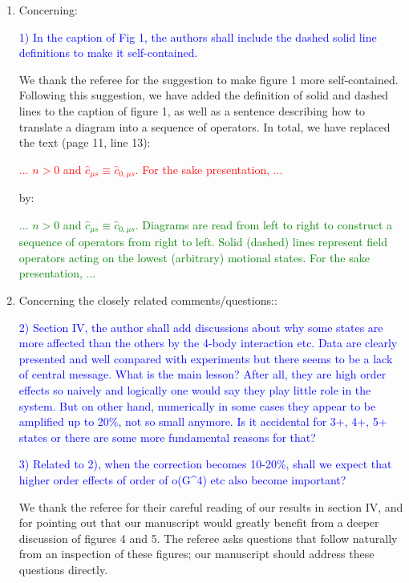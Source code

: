 \documentclass[preprint,showkeys,nofootinbib]{revtex4-1}
\renewcommand{\c}{\hat{c}}
\newcommand{\1}{\mathds{1}}
\newcommand{\blue}[1]{\textcolor{blue}{#1}}
\newcommand{\red}[1]{\textcolor{red}{#1}}
\newcommand{\green}[1]{\textcolor{green}{#1}}
\begin{document}
\begin{enumerate}
\item Concerning:

  \blue{1) In the caption of Fig 1, the authors shall include the
    dashed solid line definitions to make it self-contained.}

  We thank the referee for the suggestion to make figure 1 more
  self-contained.  Following this suggestion, we have added the
  definition of solid and dashed lines to the caption of figure 1, as
  well as a sentence describing how to translate a diagram into a
  sequence of operators.  In total, we have replaced the text (page
  11, line 13):

  \red{... $n>0$ and $\c_{\mu s}\equiv\c_{0,\mu s}$.  For the sake
    presentation, ...}

  by:

  \green{... $n>0$ and $\c_{\mu s}\equiv\c_{0,\mu s}$.  Diagrams are
    read from left to right to construct a sequence of operators from
    right to left.  Solid (dashed) lines represent field operators
    acting on the lowest (arbitrary) motional states.  For the sake
    presentation, ...}


\item Concerning the closely related comments/questions::

  \blue{2) Section IV, the author shall add discussions about why some
    states are more affected than the others by the 4-body interaction
    etc.  Data are clearly presented and well compared with
    experiments but there seems to be a lack of central message. What
    is the main lesson? After all, they are high order effects so
    naively and logically one would say they play little role in the
    system. But on other hand, numerically in some cases they appear
    to be amplified up to 20\%, not so small anymore.  Is it
    accidental for 3+, 4+, 5+ states or there are some more
    fundamental reasons for that?}

  \blue{3) Related to 2), when the correction becomes 10-20\%, shall
    we expect that higher order effects of order of o(G\^{}4) etc also
    become important?}

  \label{pt:figs}

  We thank the referee for their careful reading of our results in
  section IV, and for pointing out that our manuscript would greatly
  benefit from a deeper discussion of figures 4 and 5.  The referee
  asks questions that follow naturally from an inspection of these
  figures; our manuscript should address these questions directly.


\end{enumerate}
\end{document}
